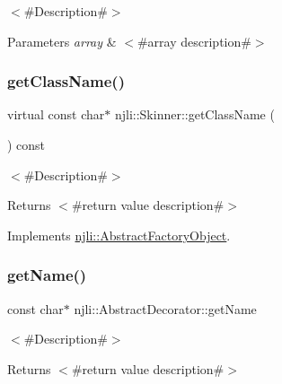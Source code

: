 $<$\#\+Description\#$>$


\begin{DoxyParams}{Parameters}
{\em array} & $<$\#array description\#$>$ \\
\hline
\end{DoxyParams}
\mbox{\label{classnjli_1_1_skinner_ad81abcf0cfc3dd6ca23709c9a88a6e75}} 
\subsubsection{\texorpdfstring{get\+Class\+Name()}{getClassName()}}
{\footnotesize\ttfamily virtual const char$\ast$ njli\+::\+Skinner\+::get\+Class\+Name (\begin{DoxyParamCaption}{ }\end{DoxyParamCaption}) const\hspace{0.3cm}{\ttfamily [virtual]}}

$<$\#\+Description\#$>$

\begin{DoxyReturn}{Returns}
$<$\#return value description\#$>$ 
\end{DoxyReturn}


Implements \mbox{\hyperlink{classnjli_1_1_abstract_factory_object_af4151e41b80d5bc3fc42822c67fc2278}{njli\+::\+Abstract\+Factory\+Object}}.

\mbox{\label{classnjli_1_1_skinner_ad41266885be835f3ee602311e20877a4}} 
\subsubsection{\texorpdfstring{get\+Name()}{getName()}}
{\footnotesize\ttfamily const char$\ast$ njli\+::\+Abstract\+Decorator\+::get\+Name}

$<$\#\+Description\#$>$

\begin{DoxyReturn}{Returns}
$<$\#return value description\#$>$ 
\end{DoxyReturn}
\mbox{\label{classnjli_1_1_skinner_ac4ca71716ed832be357f15f8262c8448}} 

